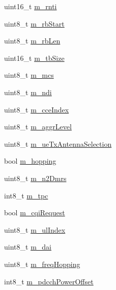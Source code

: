 \begin{DoxyCompactItemize}
\item 
uint16\+\_\+t \hyperlink{structns3_1_1UlDciListElement__s_a3ce226ecf3f65569f37e07efe52d30c7}{m\+\_\+rnti}
\item 
uint8\+\_\+t \hyperlink{structns3_1_1UlDciListElement__s_a60f3d47a11e070d28c884c6d485432bb}{m\+\_\+rb\+Start}
\item 
uint8\+\_\+t \hyperlink{structns3_1_1UlDciListElement__s_a7ac83baa0d3a905d07c1b52a945bf88e}{m\+\_\+rb\+Len}
\item 
uint16\+\_\+t \hyperlink{structns3_1_1UlDciListElement__s_a61c2ac45c8f74306a28754b639c3d67f}{m\+\_\+tb\+Size}
\item 
uint8\+\_\+t \hyperlink{structns3_1_1UlDciListElement__s_a409bd4b822166cb9c352c9e6b7634c46}{m\+\_\+mcs}
\item 
uint8\+\_\+t \hyperlink{structns3_1_1UlDciListElement__s_a60f6b41556ca38dc7c707621a366202c}{m\+\_\+ndi}
\item 
uint8\+\_\+t \hyperlink{structns3_1_1UlDciListElement__s_a28caa5a89e88ef4742fb4b8fb1888459}{m\+\_\+cce\+Index}
\item 
uint8\+\_\+t \hyperlink{structns3_1_1UlDciListElement__s_ae80a04d2d4fa35195859f2a3ceedcd3a}{m\+\_\+aggr\+Level}
\item 
uint8\+\_\+t \hyperlink{structns3_1_1UlDciListElement__s_a785073dd1af4aa97436b70c6a8833d2b}{m\+\_\+ue\+Tx\+Antenna\+Selection}
\item 
bool \hyperlink{structns3_1_1UlDciListElement__s_a90199741cd827ffaa652080d2cd1e00a}{m\+\_\+hopping}
\item 
uint8\+\_\+t \hyperlink{structns3_1_1UlDciListElement__s_a87e028beae97b1700772f113cb3d784c}{m\+\_\+n2\+Dmrs}
\item 
int8\+\_\+t \hyperlink{structns3_1_1UlDciListElement__s_a1f86b7628ab7401c4fd072ed00aa8462}{m\+\_\+tpc}
\item 
bool \hyperlink{structns3_1_1UlDciListElement__s_a87b22585ff29019fcace9c94fe3b10e3}{m\+\_\+cqi\+Request}
\item 
uint8\+\_\+t \hyperlink{structns3_1_1UlDciListElement__s_a31ce874554106bb25ba2b238e1002304}{m\+\_\+ul\+Index}
\item 
uint8\+\_\+t \hyperlink{structns3_1_1UlDciListElement__s_a25ff37466507c73d23ef3650a390353e}{m\+\_\+dai}
\item 
uint8\+\_\+t \hyperlink{structns3_1_1UlDciListElement__s_ab788d441967ef7c9f448b8668b7f5e14}{m\+\_\+freq\+Hopping}
\item 
int8\+\_\+t \hyperlink{structns3_1_1UlDciListElement__s_a1795659ecf6e62b29a5394a51e8ac23c}{m\+\_\+pdcch\+Power\+Offset}
\end{DoxyCompactItemize}


